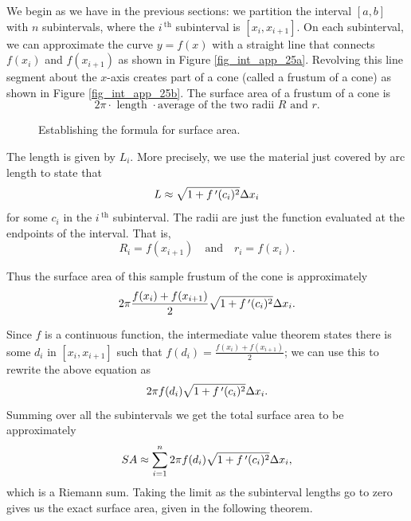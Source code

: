 We begin as we have in the previous sections: we partition the interval $[a,b]$ with $n$ subintervals, where the $i\,^{\text{th}}$ subinterval is $[x_i,x_{i+1}]$. On each subinterval, we can approximate the curve $y=f(x)$ with a straight line that connects $f(x_i)$ and $f(x_{i+1})$ as shown in Figure \ref{fig_int_app_25a}. Revolving this line segment about the $x$-axis creates part of a cone (called a frustum of a cone) as shown in Figure \ref{fig_int_app_25b}. The surface area of a frustum of a cone is 
$$2\pi\cdot\text{ length }\cdot\text{average of the two radii $R$ and $r$}.$$


\begin{figure}
\centering
\qquad
{}
\caption{Establishing the formula for surface area.}
\end{figure}

The length is given by $L_i$. More precisely, we use the material just covered by arc length to state that $$L\approx \sqrt{1+f\,'(c_i)^2}\Delta x_i$$ for some $c_i$ in the $i\,^\text{th}$ subinterval. The radii are just the function evaluated at the endpoints of the interval. That is, $$R_i = f(x_{i+1})\quad \text{and}\quad r_i = f(x_i).$$

Thus the surface area of this sample frustum of the cone is approximately 
$$2\pi\frac{f(x_i)+f(x_{i+1})}2\sqrt{1+f\,'(c_i)^2}\Delta x_i.$$

Since $f$ is a continuous function, the intermediate value theorem states there is some $d_i$ in $[x_i,x_{i+1}]$ such that $ f(d_i) = \frac{f(x_i)+f(x_{i+1})}2$; we can use this to rewrite the above equation as
$$2\pi f(d_i)\sqrt{1+f\,'(c_i)^2}\Delta x_i.$$
Summing over all the subintervals we get the total surface area to be approximately 
$$SA\approx \sum_{i=1}^n 2\pi f(d_i)\sqrt{1+f\,'(c_i)^2}\Delta x_i,$$
which is a Riemann sum. Taking the limit as the subinterval lengths go to zero gives us the exact surface area, given in the following theorem.


